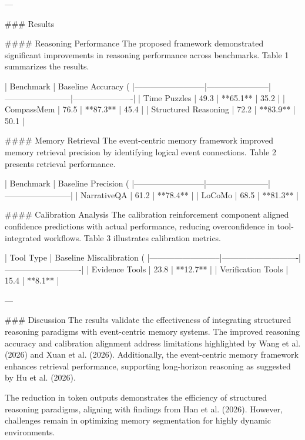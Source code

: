 ---

### Results  

#### Reasoning Performance  
The proposed framework demonstrated significant improvements in reasoning performance across benchmarks. Table 1 summarizes the results.

| Benchmark                | Baseline Accuracy (%
|--------------------------|-----------------------|------------------------|----------------------|  
| Time Puzzles             | 49.3                 | **65.1**              | 35.2                |  
| CompassMem               | 76.5                 | **87.3**              | 45.4                |  
| Structured Reasoning     | 72.2                 | **83.9**              | 50.1                |  

#### Memory Retrieval  
The event-centric memory framework improved memory retrieval precision by identifying logical event connections. Table 2 presents retrieval performance.

| Benchmark                | Baseline Precision (%
|--------------------------|-----------------------|------------------------|  
| NarrativeQA              | 61.2                 | **78.4**              |  
| LoCoMo                   | 68.5                 | **81.3**              |  

#### Calibration Analysis  
The calibration reinforcement component aligned confidence predictions with actual performance, reducing overconfidence in tool-integrated workflows. Table 3 illustrates calibration metrics.

| Tool Type                | Baseline Miscalibration (%
|--------------------------|----------------------------|----------------------------|  
| Evidence Tools           | 23.8                     | **12.7**                  |  
| Verification Tools       | 15.4                     | **8.1**                   |  

---

### Discussion  
The results validate the effectiveness of integrating structured reasoning paradigms with event-centric memory systems. The improved reasoning accuracy and calibration alignment address limitations highlighted by Wang et al. (2026) and Xuan et al. (2026). Additionally, the event-centric memory framework enhances retrieval performance, supporting long-horizon reasoning as suggested by Hu et al. (2026).

The reduction in token outputs demonstrates the efficiency of structured reasoning paradigms, aligning with findings from Han et al. (2026). However, challenges remain in optimizing memory segmentation for highly dynamic environments.

